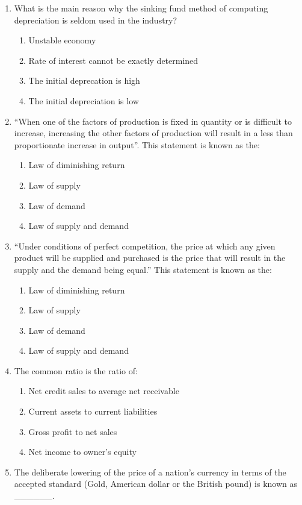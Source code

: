 \documentclass[11pt,a4paper]{article}
\begin{document}
\begin{enumerate}
\item{What is the main reason why the sinking fund method of computing depreciation is seldom used in the industry?}
\begin{enumerate}[label=\Alph*.]
\item{Unstable economy}
\item{Rate of interest cannot be exactly determined}
\item{The initial deprecation is high}
\item{The initial depreciation is low}
\end{enumerate}
\item{``When one of the factors of production is fixed in quantity or is difficult to increase, increasing the other factors of production will result in a less than proportionate increase in output''. This statement is known as the:
}
\begin{enumerate}[label=\Alph*.]
\item{Law of diminishing return}
\item{Law of supply}
\item{Law of demand}
\item{Law of supply and demand}
\end{enumerate}
\item{``Under conditions of perfect competition, the price at which any given product will be supplied and purchased is the price that will result in the supply and the demand being equal.'' This statement is known as the:
}
\begin{enumerate}[label=\Alph*.]
\item{Law of diminishing return}
\item{Law of supply}
\item{Law of demand}
\item{Law of supply and demand}
\end{enumerate}
\item{The common ratio is the ratio of:}
\begin{enumerate}[label=\Alph*.]
\item{Net credit sales to average net receivable}
\item{Current assets to current liabilities}
\item{Gross profit to net sales}
\item{Net income to owner's equity}
\end{enumerate}
\item{The deliberate lowering of the price of a nation's currency in terms of the accepted standard (Gold, American dollar or the British pound) is known as \_\_\_\_\_\_.
}
\end{enumerate}
\end{document}
